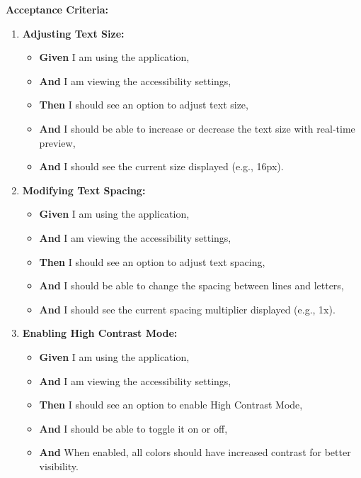 \documentclass[12pt]{article}
\begin{document}
\vspace{1em}
\textbf{Acceptance Criteria:}
\begin{enumerate}
    \item \textbf{Adjusting Text Size:}
    \begin{itemize}
        \item \textbf{Given} I am using the application,
        \item \textbf{And} I am viewing the accessibility settings,
        \item \textbf{Then} I should see an option to adjust text size,
        \item \textbf{And} I should be able to increase or decrease the text size with real-time preview,
        \item \textbf{And} I should see the current size displayed (e.g., 16px).
    \end{itemize}

    \item \textbf{Modifying Text Spacing:}
    \begin{itemize}
        \item \textbf{Given} I am using the application,
        \item \textbf{And} I am viewing the accessibility settings,
        \item \textbf{Then} I should see an option to adjust text spacing,
        \item \textbf{And} I should be able to change the spacing between lines and letters,
        \item \textbf{And} I should see the current spacing multiplier displayed (e.g., 1x).
    \end{itemize}

    \item \textbf{Enabling High Contrast Mode:}
    \begin{itemize}
        \item \textbf{Given} I am using the application,
        \item \textbf{And} I am viewing the accessibility settings,
        \item \textbf{Then} I should see an option to enable High Contrast Mode,
        \item \textbf{And} I should be able to toggle it on or off,
        \item \textbf{And} When enabled, all colors should have increased contrast for better visibility.
    \end{itemize}


\end{enumerate}
\end{document}
